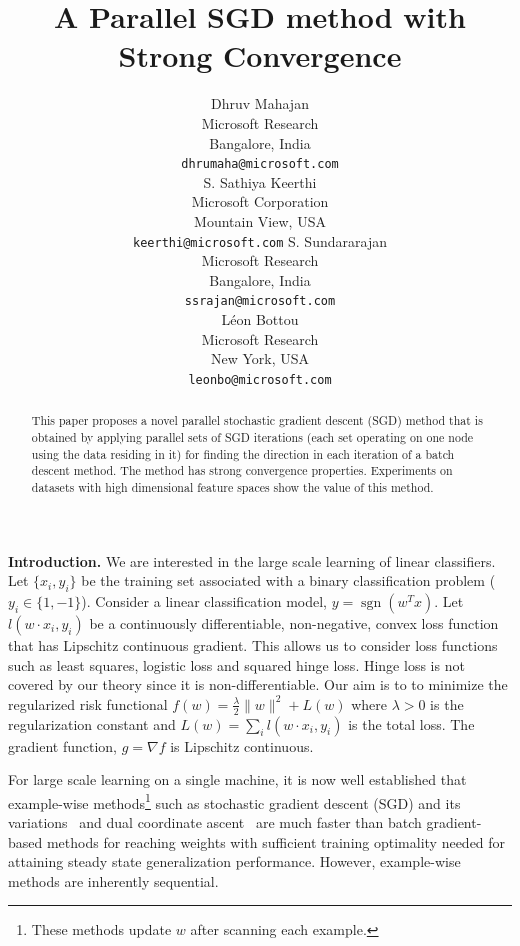 \documentclass{article} %
\title{A Parallel SGD method with Strong Convergence}
\author{
Dhruv Mahajan \\
Microsoft Research \\
Bangalore, India \\
\texttt{dhrumaha@microsoft.com} \\
\And
S. Sathiya Keerthi\\
Microsoft Corporation \\
Mountain View, USA \\
\texttt{keerthi@microsoft.com}
\AND
S. Sundararajan \\
Microsoft Research \\
Bangalore, India \\
\texttt{ssrajan@microsoft.com} \\
\And
L\'{e}on Bottou\\
Microsoft Research \\
New York, USA \\
\texttt{leonbo@microsoft.com}\\
}
\begin{document}
\maketitle

\begin{abstract}
This paper proposes a novel parallel stochastic gradient descent (SGD) method that is obtained by applying parallel sets of SGD iterations (each set operating on one node using the data residing in it) for finding the direction in each iteration of a batch descent method. The method has strong convergence properties. Experiments on datasets with high dimensional feature spaces show the value of this method.
\end{abstract}



\def\grad{\nabla}
\def\wtilde{\tilde{w}}
\def\Cone{{\cal{C}}^1}
\def\kappap{\kappa^\prime}
\def\Lhat{\hat{L}}
\def\fhat{\hat{f}}
\def\what{\hat{w}}
\def\dhat{\hat{d}}
\def\mysgn{\operatorname{sgn}}
\def\ftilde{\tilde{f}}
\def\khat{\hat{k}}
\def\defs{\stackrel{\text{def}}{=}}
\def\vhat{\hat{v}}

\def\ttilde{\tilde{t}}
\def\that{\hat{t}}
\def\tstar{t^\star}

{\bf Introduction.}
We are interested in the large scale learning of linear classifiers. Let $\{x_i,y_i\}$ be the training set associated with a binary classification problem ($y_i\in\{1,-1\}$). Consider a linear classification model, $y=\mysgn(w^Tx)$. Let $l(w\cdot x_i,y_i)$ be a continuously differentiable, non-negative, convex loss function that has Lipschitz continuous gradient. This allows us to consider loss functions such as least squares, logistic loss and squared hinge loss. Hinge loss is not covered by our theory since it is non-differentiable. Our aim is to to minimize the regularized risk functional $f(w)=\frac{\lambda}{2}\|w\|^2 + L(w)$ where $\lambda>0$ is the regularization constant and $L(w)=\sum_i l(w\cdot x_i,y_i)$ is the total loss. The gradient function, $g=\grad f$ is Lipschitz continuous.

For large scale learning on a single machine, it is now well established that example-wise methods\footnote{These methods update $w$ after scanning each example.} such as stochastic gradient descent (SGD) and its variations~\cite{bottou2010, leroux2012, johnson2013} and dual coordinate ascent~\cite{hsieh2008} are much faster than batch gradient-based methods for reaching weights with sufficient training optimality needed for attaining steady state generalization performance. However, example-wise methods are inherently sequential.
\end{document}
